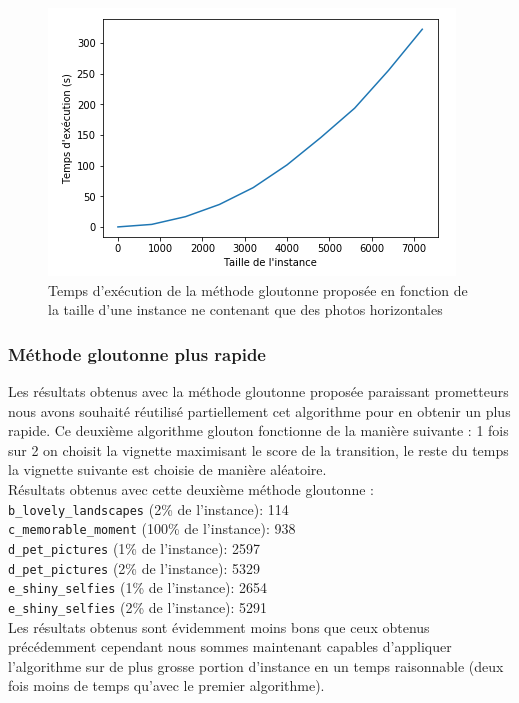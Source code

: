 \documentclass[12pt,a4paper]{article}
\begin{document}
\begin{figure}[!h]
\centering
\includegraphics[scale=0.8]{CourbeGlouton1.png}
\caption{Temps d'exécution de la méthode gloutonne proposée en fonction de la taille d'une instance ne contenant que des photos horizontales }
\end{figure}

\subsubsection{Méthode gloutonne plus rapide}

\vspace{1\baselineskip}

\noindent Les résultats obtenus avec la méthode gloutonne proposée paraissant prometteurs nous avons souhaité réutilisé partiellement cet algorithme pour en obtenir un plus rapide. Ce deuxième algorithme glouton fonctionne de la manière suivante : 1 fois sur 2 on choisit la vignette maximisant le score de la transition, le reste du temps la vignette suivante est choisie de manière aléatoire.
\vspace{.5\baselineskip}\\
Résultats obtenus avec cette deuxième méthode gloutonne :
\vspace{0.5\baselineskip}\\
\verb|b_lovely_landscapes| (2\% de l'instance): 114  \\
\verb|c_memorable_moment| (100\% de l'instance): 938 \\ 
\verb|d_pet_pictures| (1\% de l'instance): 2597  \\
\verb|d_pet_pictures| (2\% de l'instance): 5329  \\
\verb|e_shiny_selfies| (1\% de l'instance): 2654\\
\verb|e_shiny_selfies| (2\% de l'instance): 5291 
\vspace{1\baselineskip}\\
Les résultats obtenus sont évidemment moins bons que ceux obtenus précédemment cependant nous sommes maintenant capables d'appliquer l’algorithme sur de plus grosse portion d'instance en un temps raisonnable (deux fois moins de temps qu'avec le premier algorithme).
\end{document}
